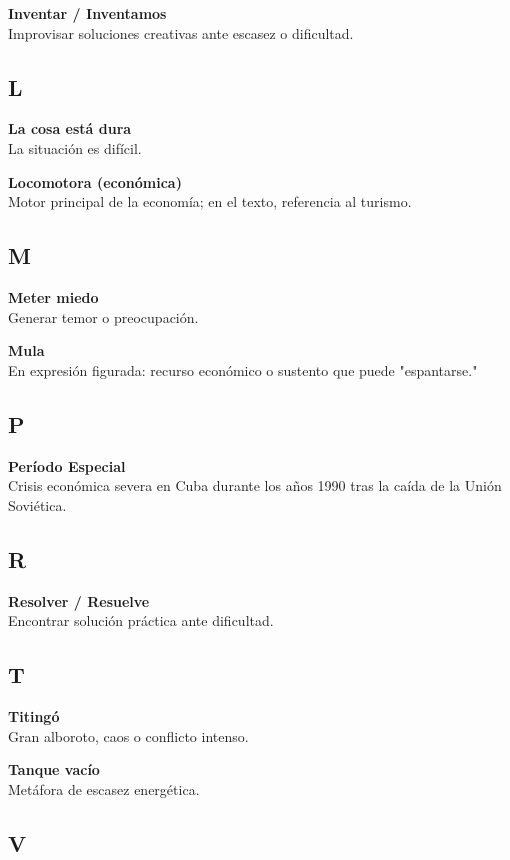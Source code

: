 \documentclass[12pt]{article}
\begin{document}
\textbf{Inventar / Inventamos}\\
Improvisar soluciones creativas ante escasez o dificultad.

\subsection*{L}

\textbf{La cosa está dura}\\
La situación es difícil.

\textbf{Locomotora (económica)}\\
Motor principal de la economía; en el texto, referencia al turismo.

\subsection*{M}

\textbf{Meter miedo}\\
Generar temor o preocupación.

\textbf{Mula}\\
En expresión figurada: recurso económico o sustento que puede "espantarse."

\subsection*{P}

\textbf{Período Especial}\\
Crisis económica severa en Cuba durante los años 1990 tras la caída de la Unión Soviética.

\subsection*{R}

\textbf{Resolver / Resuelve}\\
Encontrar solución práctica ante dificultad.

\subsection*{T}

\textbf{Titingó}\\
Gran alboroto, caos o conflicto intenso.

\textbf{Tanque vacío}\\
Metáfora de escasez energética.

\subsection*{V}
\end{document}
